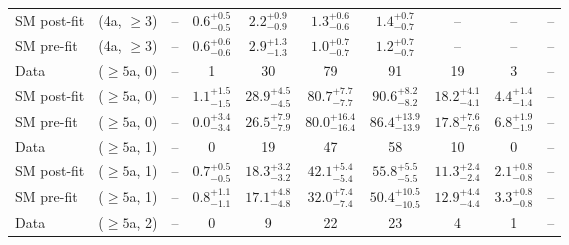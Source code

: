 \begin{table}[h!]
{\begin{tabular}{lccccccccc}
	SM post-fit & (4a, $\ge3$)      & --                             & $0.6^{+ 0.5 }_{- 0.5 }$        & $2.2^{+ 0.9 }_{- 0.9 }$     & $1.3^{+ 0.6 }_{- 0.6 }$     & $1.4^{+ 0.7 }_{- 0.7 }$     & --                       & --                       & --           \\[0.5ex] 
	SM pre-fit  & (4a, $\ge3$)      & --                             & $0.6^{+ 0.6 }_{- 0.6 }$        & $2.9^{+ 1.3 }_{- 1.3 }$     & $1.0^{+ 0.7 }_{- 0.7 }$     & $1.2^{+ 0.7 }_{- 0.7 }$     & --                       & --                       & --           \\[0.5ex] 
	Data        & ($\ge5$a, 0)      & --                             & 1                              & 30                          & 79                          & 91                          & 19                       & 3                        & --           \\[0.5ex] 
	SM post-fit & ($\ge5$a, 0)      & --                             & $1.1^{+ 1.5 }_{- 1.5 }$        & $28.9^{+ 4.5 }_{- 4.5 }$    & $80.7^{+ 7.7 }_{- 7.7 }$    & $90.6^{+ 8.2 }_{- 8.2 }$    & $18.2^{+ 4.1 }_{- 4.1 }$ & $4.4^{+ 1.4 }_{- 1.4 }$  & --           \\[0.5ex] 
	SM pre-fit  & ($\ge5$a, 0)      & --                             & $0.0^{+ 3.4 }_{- 3.4 }$        & $26.5^{+ 7.9 }_{- 7.9 }$    & $80.0^{+ 16.4 }_{- 16.4 }$  & $86.4^{+ 13.9 }_{- 13.9 }$  & $17.8^{+ 7.6 }_{- 7.6 }$ & $6.8^{+ 1.9 }_{- 1.9 }$  & --           \\[0.5ex] 
	Data        & ($\ge5$a, 1)      & --                             & 0                              & 19                          & 47                          & 58                          & 10                       & 0                        & --           \\[0.5ex] 
	SM post-fit & ($\ge5$a, 1)      & --                             & $0.7^{+ 0.5 }_{- 0.5 }$        & $18.3^{+ 3.2 }_{- 3.2 }$    & $42.1^{+ 5.4 }_{- 5.4 }$    & $55.8^{+ 5.5 }_{- 5.5 }$    & $11.3^{+ 2.4 }_{- 2.4 }$ & $2.1^{+ 0.8 }_{- 0.8 }$  & --           \\[0.5ex] 
	SM pre-fit  & ($\ge5$a, 1)      & --                             & $0.8^{+ 1.1 }_{- 1.1 }$        & $17.1^{+ 4.8 }_{- 4.8 }$    & $32.0^{+ 7.4 }_{- 7.4 }$    & $50.4^{+ 10.5 }_{- 10.5 }$  & $12.9^{+ 4.4 }_{- 4.4 }$ & $3.3^{+ 0.8 }_{- 0.8 }$  & --           \\[0.5ex] 
	Data        & ($\ge5$a, 2)      & --                             & 0                              & 9                           & 22                          & 23                          & 4                        & 1                        & --           \\[0.5ex] 

\end{tabular}}
\end{table}
